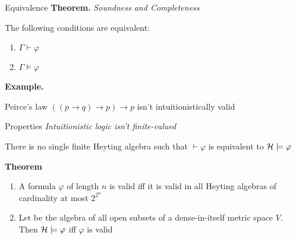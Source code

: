 \documentclass[sans]{beamer}
\begin{document}
\begin{frame}{Equivalence}
  \textbf{Theorem.} \emph{Soundness and Completeness}
  
  The following conditions are equivalent:
  \begin{enumerate}
    \item $\Gamma \vdash \varphi$
    \item $\Gamma \models \varphi$
  \end{enumerate}

  \vfill
  \pause
  \textbf{Example.}
  
  Peirce's law $((p \to q) \to p) \to p$ isn't intuitionistically valid

\end{frame}

\begin{frame}{Properties}
  \emph{Intuitionistic logic isn't finite-valued}

  There is no single finite Heyting algebra \calh such that $\vdash \varphi$ is equivalent to
  $\mathcal{H} \models \varphi$

  \pause
  \vfill
  \textbf{Theorem}
  \begin{enumerate}
    \item A formula $\varphi$ of length $n$ is valid iff it is valid in all Heyting algebras
          of cardinality at most $2^{2^n}$
    \item Let \calh be the algebra of all open subsets of a dense-in-itself metric space $V$.
          Then $\mathcal{H} \models \varphi$ iff $\varphi$ is valid
  \end{enumerate}

\end{frame}
\end{document}
